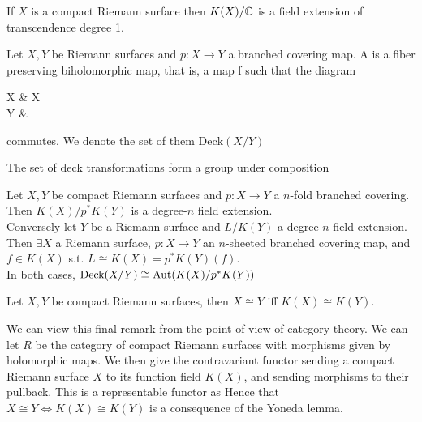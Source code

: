 \documentclass{article}
\begin{document}
\begin{prop}
	If $X$ is a compact Riemann surface then $K(X)/\mathbb{C}$ is a field extension of transcendence degree 1.  
\end{prop}

\begin{definition}
	Let $X, Y$ be Riemann surfaces and $p : X \to Y$ a branched covering map. A  is a fiber preserving biholomorphic map, that is, a map f such that the diagram
	\begin{tkz}
		X \arrow[r,"f"] \arrow[d,"p"'] & X \arrow[dl,"p"]\\
		Y &
	\end{tkz}
	commutes. We denote the set of them  $\text{Deck}(X/Y)$
\end{definition}

\begin{prop}
	The set of deck transformations form a group under composition
\end{prop}

\begin{theorem}
	Let $X,Y$ be compact Riemann surfaces and $p:X \to Y$ a $n$-fold branched covering. Then $K(X)/p^\ast K(Y)$ is a degree-$n$ field extension. \\
	Conversely let $Y$ be a Riemann surface and $L/K(Y)$ a degree-$n$ field extension. Then $\exists X$ a Riemann surface, $p:X \to Y$ an $n$-sheeted branched covering map, and $f \in K(X)$ s.t. $L\cong K(X)=p^\ast K(Y)(f)$. \\
	In both cases, $\text{Deck}(X/Y) \cong \operatorname{Aut}(K(X) / p^\ast K(Y))$  
\end{theorem}

\begin{corollary}
	Let $X,Y$ be compact Riemann surfaces, then $X\cong Y$ iff $K(X) \cong K(Y)$. 
\end{corollary}

\begin{remark}
	We can view this final remark from the point of view of category theory. We can let $R$ be the category of compact Riemann surfaces with morphisms given by holomorphic maps. We then give the contravariant functor 
sending a compact Riemann surface $X$ to its function field $K(X)$, and sending morphisms to their pullback. This is a representable functor as 
Hence that $X \cong Y \Leftrightarrow K(X) \cong K(Y)$ is a consequence of the Yoneda lemma. 
\end{remark}
\end{document}
